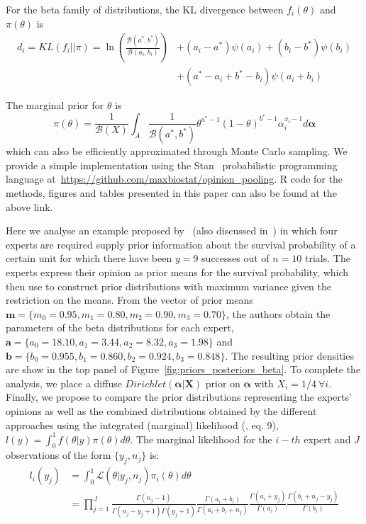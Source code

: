\documentclass[a4paper, notitlepage, 11pt]{article}
\begin{document}
For the beta family of distributions, the KL divergence between $f_i(\theta)$ and $\pi(\theta)$ is
\begin{equation}
\begin{split}
 \label{eq:KLbeta}
 d_i = KL(f_i||\pi) = \ln\left(\frac{\mathcal{B}(a^*, b^*)}{\mathcal{B}(a_i, 
b_i)}\right) &+ (a_i-a^*)\psi(a_i)+ (b_i-b^*)\psi(b_i) \\
 &+ (a^*-a_i + b^* - b_i)\psi(a_i+b_i)
\end{split}
 \end{equation}

The marginal prior for $\theta$ is
\begin{equation}
\label{eq:marginalbeta}
\pi(\theta) = \frac{1}{\mathcal{B}(X)}\int_{A} \frac{1}{\mathcal{B}(a^*, b^*)} \theta^{a^* -1}(1-\theta)^{b^* -1}\alpha_i^{x_i-1}d\boldsymbol\alpha 
\end{equation}
which can also be efficiently approximated through Monte Carlo sampling.
We provide a simple implementation using the Stan~\citep{stan2014} probabilistic programming language at~\url{https://github.com/maxbiostat/opinion_pooling}.
R code for the methods, figures and tables presented in this paper can also be found at the above link.

Here we analyse an example proposed by~\cite{savchuk1994} (also discussed in~\cite{rufo2012B}) in which four experts are required supply prior information about the survival probability of a certain unit for which there have been $y = 9$ successes out of $n = 10$ trials.
The experts express their opinion as prior means for the survival probability, which~\cite{savchuk1994} then use to construct prior distributions with maximum variance given the restriction on the means.
From the vector of prior means $\mathbf{m} = \{ m_0 = 0.95, m_1 = 0.80, m_2 = 0.90, m_3 = 0.70 \}$, the authors obtain the parameters of the beta distributions for each expert,  $\mathbf{a} = \{ a_0 = 18.10, a_1 = 3.44 , a_2 = 8.32, a_3 = 1.98 \}$ and  $\mathbf{b} = \{ b_0 = 0.955 , b_1 = 0.860, b_2 = 0.924, b_3 = 0.848\}$.
The resulting prior densities are show in the top panel of Figure~\ref{fig:priors_posteriors_beta}.
To complete the analysis, we place a diffuse $Dirichlet(\boldsymbol\alpha | \boldsymbol X)$ prior on $\boldsymbol\alpha$ with $X_i = 1/4 \: \forall i$.
Finally, we propose to compare the prior distributions representing the experts' opinions as well as the combined distributions obtained by the different approaches using the integrated (marginal) likelihood (\cite{raftery2007}, eq. 9), $l(y) = \int_{0}^{1}f(\theta|y)\pi(\theta)d\theta$.
The marginal likelihood for the $i-th$ expert and $J$ observations of the form $\{ y_j, n_j\}$ is:
\begin{align}
  \label{eq:marglike}
l_i(y_j) &= \int_{0}^{1}\mathcal{L}(\theta|y_j, n_j)\pi_i(\theta)d\theta\nonumber\\
 &= \prod_{j = 1}^{J}\frac{\Gamma(n_j-1)}{\Gamma(n_j-y_j + 1)\Gamma(y_j+1)}\frac{\Gamma(a_i + b_i)}{\Gamma(a_i + b_i + n_j)}\frac{\Gamma(a_i + y_j)}{\Gamma(a_i)}\frac{\Gamma(b_i + n_j - y_j) }{\Gamma(b_i)}
 \end{align}
 
\end{document}
